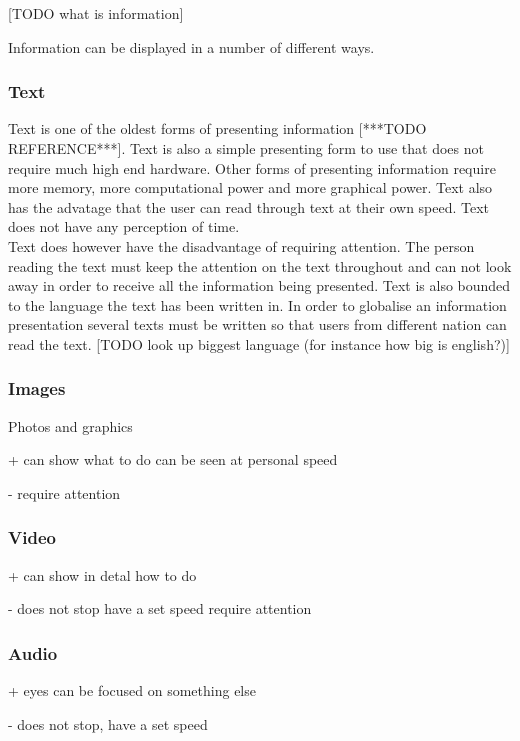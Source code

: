[TODO what is information]

Information can be displayed in a number of different ways.

\subsubsection{Text}
Text is one of the oldest forms of presenting information [***TODO REFERENCE***]. Text is also a simple presenting form to use that does not require much high end hardware. Other forms of presenting information require more memory, more computational power and more graphical power. Text also has the advatage that the user can read through text at their own speed. Text does not have any perception of time.\\

Text does however have the disadvantage of requiring attention. The person reading the text must keep the attention on the text throughout and can not look away in order to receive all the information being presented. Text is also bounded to the language the text has been written in. In order to globalise an information presentation several texts must be written so that users from different nation can read the text. [TODO look up biggest language (for instance how big is english?)]

\subsubsection{Images}
Photos and graphics

+
can show what to do
can be seen at personal speed

-
require attention

\subsubsection{Video}

+
can show in detal how to do

-
does not stop have a set speed
require attention

\subsubsection{Audio}

+
eyes can be focused on something else

-
does not stop, have a set speed